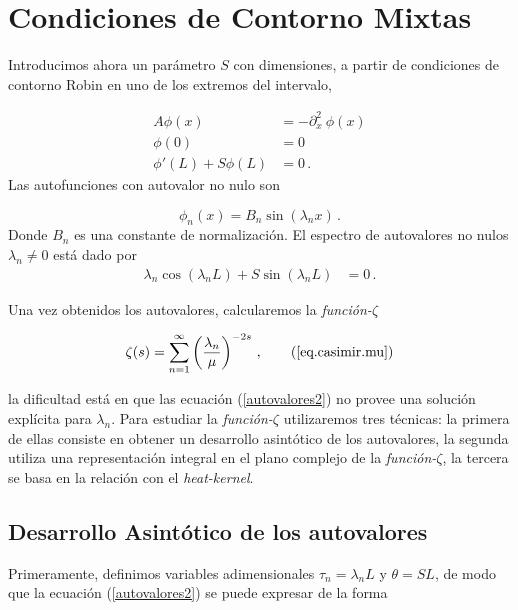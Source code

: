 \section{Condiciones de Contorno Mixtas}


Introducimos ahora un parámetro $S$ con dimensiones, a partir de condiciones de contorno Robin en uno de los extremos del intervalo,

\begin{equation}
\begin{aligned}
    A \phi (x) &= - \partial ^2 _x \ \phi (x)  \\[5pt]
    \phi (0) &= 0 \\[5pt]
    \phi ' (L) + S \phi (L) &= 0 \, .
\end{aligned}
\end{equation}
Las autofunciones con autovalor no nulo son

\begin{equation}
\phi _n (x) = 
B _n \sin ( \lambda _n x ) \, .
\end{equation}
Donde $B_n$ es una constante de normalización. El espectro de autovalores no nulos $\lambda _n \neq 0 $ está dado por
\begin{align}
    \lambda _n   \cos( \lambda _n L) +  S \sin( \lambda _n L) &= 0
    \, . \label{autovalores2} 
\end{align}

Una vez obtenidos los autovalores, calcularemos la {\it función-$\zeta$}

\begin{equation}
    \zeta (s) =  \sum_{n = 1} ^{ \infty } \left( \frac{\lambda _n}{\mu } \right) ^ {-2 s} \, ,
    \tag{\ref{eq.casimir.mu}}
\end{equation}

la dificultad está en que las ecuación (\ref{autovalores2}) no provee una solución explícita para $\lambda _n$. Para estudiar la  {\it función-$\zeta$} utilizaremos tres técnicas: la primera de ellas consiste en obtener un desarrollo asintótico de los autovalores, la segunda utiliza una representación integral en el plano complejo de la {\it función-$\zeta$}, la tercera se basa en la relación con el {\it heat-kernel}. 

\subsection{Desarrollo Asintótico de los autovalores}{\label{seq.asin}}

Primeramente, definimos variables adimensionales $\tau _n = \lambda _n L $ y $\theta = S L $, de modo que la ecuación (\ref{autovalores2}) se puede expresar de la forma

